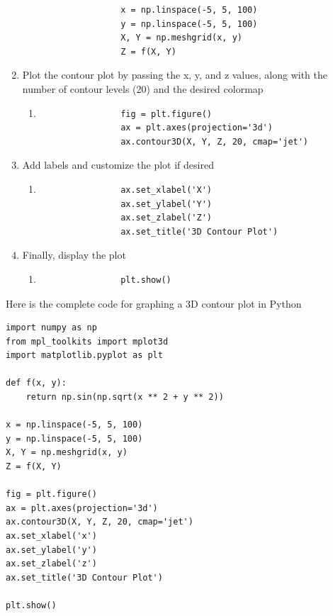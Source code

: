 \documentclass[
11pt, %
a4paper, %
oneside, %
headinclude,footinclude, %
BCOR5mm, %
]{scrartcl}
\begin{document}
\begin{enumerate}
\begin{enumerate}
\begin{verbatim}
        		x = np.linspace(-5, 5, 100)
        		y = np.linspace(-5, 5, 100)
        		X, Y = np.meshgrid(x, y)
        		Z = f(X, Y)
        	\end{verbatim}
        \end{enumerate}
    \item Plot the contour plot by passing the x, y, and z values, along with the number of contour levels (20) and the desired colormap
        \begin{enumerate}
        	\item[] \begin{verbatim}
        		fig = plt.figure()
        		ax = plt.axes(projection='3d')
        		ax.contour3D(X, Y, Z, 20, cmap='jet')
        	\end{verbatim}
        \end{enumerate}
    \item Add labels and customize the plot if desired
        \begin{enumerate}
        	\item[] \begin{verbatim}
        		ax.set_xlabel('X')
        		ax.set_ylabel('Y')
        		ax.set_zlabel('Z')
        		ax.set_title('3D Contour Plot')
        	\end{verbatim}
        \end{enumerate}
	\item Finally, display the plot
     	\begin{enumerate}
     		\item[] \begin{verbatim}
     			plt.show()
     		\end{verbatim}
     	\end{enumerate}
\end{enumerate}

Here is the complete code for graphing a 3D contour plot in Python

\begin{verbatim}
import numpy as np
from mpl_toolkits import mplot3d
import matplotlib.pyplot as plt

def f(x, y):
    return np.sin(np.sqrt(x ** 2 + y ** 2))

x = np.linspace(-5, 5, 100)
y = np.linspace(-5, 5, 100)
X, Y = np.meshgrid(x, y)
Z = f(X, Y)

fig = plt.figure()
ax = plt.axes(projection='3d')
ax.contour3D(X, Y, Z, 20, cmap='jet')
ax.set_xlabel('x')
ax.set_ylabel('y')
ax.set_zlabel('z')
ax.set_title('3D Contour Plot')

plt.show()
\end{verbatim}
\end{document}
